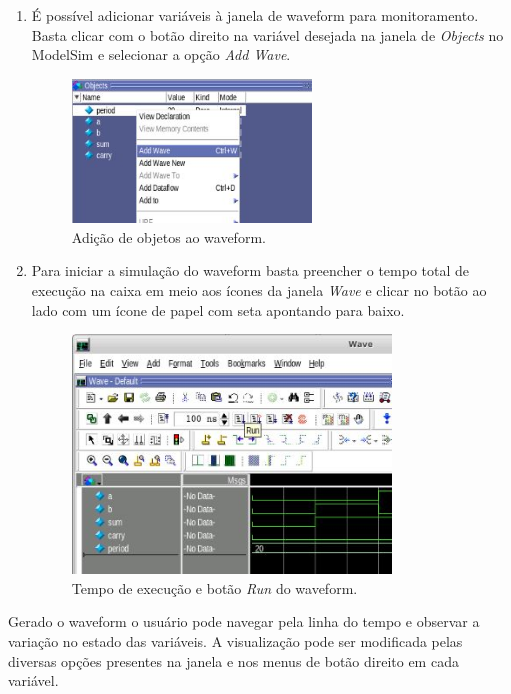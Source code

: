 \documentclass[12pt]{article}
\begin{document}
\begin{enumerate}[font=\bfseries]
    \item É possível adicionar variáveis à janela de waveform para monitoramento. Basta clicar com o botão direito na variável desejada na janela de \textit{Objects} no ModelSim e selecionar a opção \textit{Add Wave}.
    \begin{figure}[H]
    \centering
    \includegraphics[width=0.6\textwidth]{img/modelsim-object.jpg}
    \caption{\label{ref:modelsim-object}Adição de objetos ao waveform.}
    \end{figure}

    \item Para iniciar a simulação do waveform basta preencher o tempo total de execução na caixa em meio aos ícones da janela \textit{Wave} e clicar no botão ao lado com um ícone de papel com seta apontando para baixo. 
    \begin{figure}[H]
    \centering
    \includegraphics[width=0.8\textwidth]{img/modelsim-runwave.jpg}
    \caption{\label{ref:modelsim-runwave}Tempo de execução e botão \textit{Run} do waveform.}
    \end{figure}
\end{enumerate}

Gerado o waveform o usuário pode navegar pela linha do tempo e observar a variação no estado das variáveis. A visualização pode ser modificada pelas diversas opções presentes na janela e nos menus de botão direito em cada variável.
\end{document}
